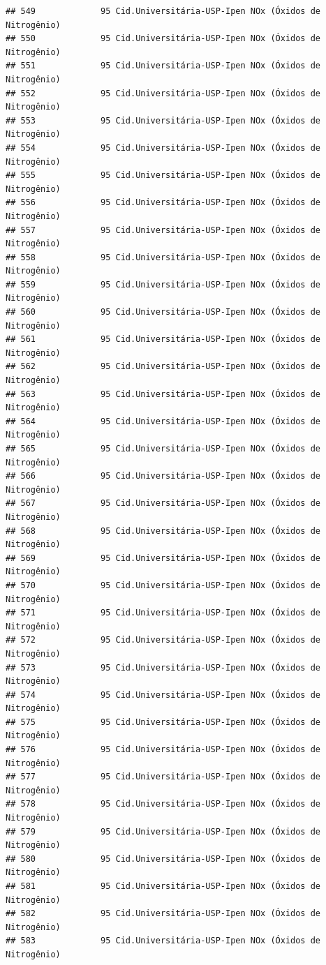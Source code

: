 \documentclass[]{book}
\begin{document}
\begin{verbatim}
## 549             95 Cid.Universitária-USP-Ipen NOx (Óxidos de Nitrogênio)
## 550             95 Cid.Universitária-USP-Ipen NOx (Óxidos de Nitrogênio)
## 551             95 Cid.Universitária-USP-Ipen NOx (Óxidos de Nitrogênio)
## 552             95 Cid.Universitária-USP-Ipen NOx (Óxidos de Nitrogênio)
## 553             95 Cid.Universitária-USP-Ipen NOx (Óxidos de Nitrogênio)
## 554             95 Cid.Universitária-USP-Ipen NOx (Óxidos de Nitrogênio)
## 555             95 Cid.Universitária-USP-Ipen NOx (Óxidos de Nitrogênio)
## 556             95 Cid.Universitária-USP-Ipen NOx (Óxidos de Nitrogênio)
## 557             95 Cid.Universitária-USP-Ipen NOx (Óxidos de Nitrogênio)
## 558             95 Cid.Universitária-USP-Ipen NOx (Óxidos de Nitrogênio)
## 559             95 Cid.Universitária-USP-Ipen NOx (Óxidos de Nitrogênio)
## 560             95 Cid.Universitária-USP-Ipen NOx (Óxidos de Nitrogênio)
## 561             95 Cid.Universitária-USP-Ipen NOx (Óxidos de Nitrogênio)
## 562             95 Cid.Universitária-USP-Ipen NOx (Óxidos de Nitrogênio)
## 563             95 Cid.Universitária-USP-Ipen NOx (Óxidos de Nitrogênio)
## 564             95 Cid.Universitária-USP-Ipen NOx (Óxidos de Nitrogênio)
## 565             95 Cid.Universitária-USP-Ipen NOx (Óxidos de Nitrogênio)
## 566             95 Cid.Universitária-USP-Ipen NOx (Óxidos de Nitrogênio)
## 567             95 Cid.Universitária-USP-Ipen NOx (Óxidos de Nitrogênio)
## 568             95 Cid.Universitária-USP-Ipen NOx (Óxidos de Nitrogênio)
## 569             95 Cid.Universitária-USP-Ipen NOx (Óxidos de Nitrogênio)
## 570             95 Cid.Universitária-USP-Ipen NOx (Óxidos de Nitrogênio)
## 571             95 Cid.Universitária-USP-Ipen NOx (Óxidos de Nitrogênio)
## 572             95 Cid.Universitária-USP-Ipen NOx (Óxidos de Nitrogênio)
## 573             95 Cid.Universitária-USP-Ipen NOx (Óxidos de Nitrogênio)
## 574             95 Cid.Universitária-USP-Ipen NOx (Óxidos de Nitrogênio)
## 575             95 Cid.Universitária-USP-Ipen NOx (Óxidos de Nitrogênio)
## 576             95 Cid.Universitária-USP-Ipen NOx (Óxidos de Nitrogênio)
## 577             95 Cid.Universitária-USP-Ipen NOx (Óxidos de Nitrogênio)
## 578             95 Cid.Universitária-USP-Ipen NOx (Óxidos de Nitrogênio)
## 579             95 Cid.Universitária-USP-Ipen NOx (Óxidos de Nitrogênio)
## 580             95 Cid.Universitária-USP-Ipen NOx (Óxidos de Nitrogênio)
## 581             95 Cid.Universitária-USP-Ipen NOx (Óxidos de Nitrogênio)
## 582             95 Cid.Universitária-USP-Ipen NOx (Óxidos de Nitrogênio)
## 583             95 Cid.Universitária-USP-Ipen NOx (Óxidos de Nitrogênio)

\end{verbatim}
\end{document}
